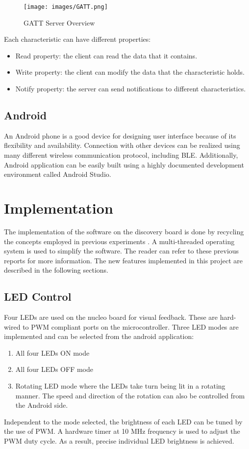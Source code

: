 \documentclass[12pt]{article}
\begin{document}
\begin{figure}[!htb]
 \centering
 \texttt{[image: images/GATT.png]}
 \caption{GATT Server Overview}
 \label{fig:gatt}
\end{figure}

Each characteristic can have different properties:
\begin{itemize}
\item Read property: the client can read the data that it contains.
\item Write property: the client can modify the data that the characteristic holds.
\item Notify property: the server can send notifications to different characteristics.
\end{itemize}

\subsection{Android}
An Android phone is a good device for designing user interface because of its flexibility and availability. Connection with other devices can be realized using many different wireless communication protocol, including BLE. Additionally, Android application can be easily built using a highly documented development environment called Android Studio.

\section{Implementation}
The implementation of the software on the discovery board is done by recycling the concepts employed in previous experiments \cite{Lab2report}\cite{Lab4report}. A multi-threaded operating system is used to simplify the software. The reader can refer to these previous reports for more information. The new features implemented in this project are described in the following sections.

\subsection{LED Control}
Four LEDs are used on the nucleo board for visual feedback. These are hard-wired to PWM compliant ports on the microcontroller. Three LED modes are implemented and can be selected from the android application:
\begin{enumerate}
\item All four LEDs ON mode
\item All four LEDs OFF mode
\item Rotating LED mode where the LEDs take turn being lit in a rotating manner. The speed and direction of the rotation can also be controlled from the Android side.
\end{enumerate}
Independent to the mode selected, the brightness of each LED can be tuned by the use of PWM. A hardware timer at 10 MHz frequency is used to adjust the PWM duty cycle. As a result, precise individual LED brightness is achieved.
\end{document}
